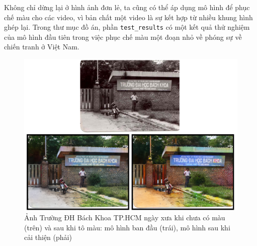 \documentclass[a4paper, 12pt]{report}
\begin{document}
Không chỉ dừng lại ở hình ảnh đơn lẻ, ta cũng có thể áp dụng mô hình để phục chế màu cho các video, vì bản chất một video là sự kết hợp từ nhiều khung hình ghép lại.
Trong thư mục đồ án, phần \texttt{test\_results} có một kết quả thử nghiệm của mô hình đầu tiên trong việc phục chế màu một đoạn nhỏ về phóng sự về chiến tranh ở Việt Nam.

\begin{figure}[!h]
\captionsetup{width=0.85\textwidth}
\centering
\includegraphics[width=15cm]{images/final.PNG}
\caption{Ảnh Trường ĐH Bách Khoa TP.HCM ngày xưa khi chưa có màu (trên) và sau khi tô màu: mô hình ban đầu (trái), mô hình sau khi cải thiện (phải)}
\label{fig:bkhcmold}
\end{figure}

\renewcommand{\bibname}{Tài liệu tham khảo}

\printbibliography
\end{document}
